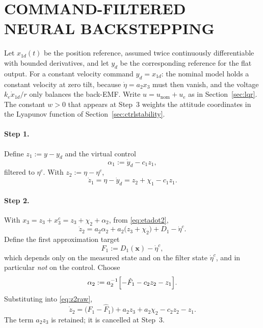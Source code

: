 \section{COMMAND-FILTERED NEURAL BACKSTEPPING}
\label{sec:cffb}

Let $x_{1d}(t)$ be the position reference, assumed twice continuously
differentiable with bounded derivatives, and let $y_d$ be the corresponding
reference for the flat output. For a constant velocity command $y_d=x_{1d}$:
the nominal model holds a constant velocity at zero tilt, because
$\dot\eta=a_2x_3$ must then vanish, and the voltage $k_e\dot x_{1d}/r$ only
balances the back-EMF. Write
$u=u_{\mathrm{nom}}+u_e$ as in Section~\ref{sec:lqr}. The constant $w>0$ that
appears at Step~3 weights the attitude coordinates in the Lyapunov function of
Section~\ref{sec:ctrlstability}.

\paragraph{Step 1.} Define $z_1:=y-y_d$ and the virtual control
\begin{equation}\label{eq:alpha1}
\alpha_1:=\dot y_d-c_1z_1 ,
\end{equation}
filtered to $\eta^c$. With $z_2:=\eta-\eta^c$,
\begin{equation}\label{eq:z1dot}
\dot z_1=\eta-\dot y_d=z_2+\chi_1-c_1z_1 .
\end{equation}

\paragraph{Step 2.} With $x_3=z_3+x_3^c=z_3+\chi_2+\alpha_2$, from
\eqref{eq:etadot2},
\begin{equation}\label{eq:z2raw}
\dot z_2=a_2\alpha_2+a_2\bigl(z_3+\chi_2\bigr)+D_1-\dot\eta^c .
\end{equation}
Define the first approximation target
\begin{equation}\label{eq:F1}
F_1:=D_1(\mathbf{x})-\dot\eta^c ,
\end{equation}
which depends only on the measured state and on the filter state $\dot\eta^c$,
and in particular \emph{not} on the control. Choose
\begin{equation}\label{eq:alpha2}
\alpha_2:=a_2^{-1}\Bigl[-\hat F_1-c_2z_2-z_1\Bigr].
\end{equation}
Substituting into \eqref{eq:z2raw},
\begin{equation}\label{eq:z2dot}
\dot z_2=\bigl(F_1-\hat F_1\bigr)+a_2z_3+a_2\chi_2-c_2z_2-z_1 .
\end{equation}
The term $a_2z_3$ is retained; it is cancelled at Step~3.

